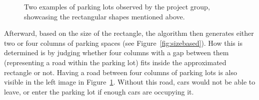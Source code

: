 \begin{figure}[H]
  \centering
  \begin{subfigure}[b]{0.55\textwidth}
  \end{subfigure}
  \quad
  \begin{subfigure}[b]{0.395\textwidth}
  \end{subfigure}
  \caption{Two examples of parking lots observed by the project group, showcasing the rectangular shapes mentioned above.}
  \label{fig:parkings}
\end{figure}
Afterward, based on the size of the rectangle, the algorithm then generates either two or four columns of parking spaces (see Figure~\ref{fig:sizebased}).
How this is determined is by judging whether four columns with a gap between them (representing a road within the parking lot) fits inside the approximated rectangle or not.
Having a road between four columns of parking lots is also visible in the left image in Figure~\ref{fig:parkings}. 
Without this road, cars would not be able to leave, or enter the parking lot if enough cars are occupying it.

